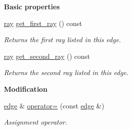 \begin{Indent}\textbf{ Basic properties}\par
\begin{DoxyCompactItemize}
\item 
\mbox{\label{group___c_l_s_solvers_a7c35e5555bd71f1e9f6231216b8c882e}} 
\hyperlink{group___c_l_s_solvers_classray}{ray} \hyperlink{group___c_l_s_solvers_a7c35e5555bd71f1e9f6231216b8c882e}{get\+\_\+first\+\_\+ray} () const
\begin{DoxyCompactList}\small\item\em Returns the first ray listed in this edge. \end{DoxyCompactList}\item 
\mbox{\label{group___c_l_s_solvers_a2baca8d9ca7f40edfb9364df3ec4c4a8}} 
\hyperlink{group___c_l_s_solvers_classray}{ray} \hyperlink{group___c_l_s_solvers_a2baca8d9ca7f40edfb9364df3ec4c4a8}{get\+\_\+second\+\_\+ray} () const
\begin{DoxyCompactList}\small\item\em Returns the second ray listed in this edge. \end{DoxyCompactList}\end{DoxyCompactItemize}
\end{Indent}
\begin{Indent}\textbf{ Modification}\par
\begin{DoxyCompactItemize}
\item 
\mbox{\label{group___c_l_s_solvers_acd5e308a604773f2d414732b6a873032}} 
\hyperlink{group___c_l_s_solvers_classedge}{edge} \& \hyperlink{group___c_l_s_solvers_acd5e308a604773f2d414732b6a873032}{operator=} (const \hyperlink{group___c_l_s_solvers_classedge}{edge} \&)
\begin{DoxyCompactList}\small\item\em Assignment operator. \end{DoxyCompactList}\end{DoxyCompactItemize}
\end{Indent}
